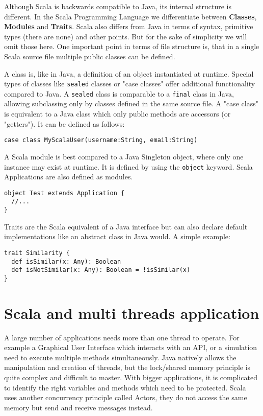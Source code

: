 \documentclass[
	a4paper,					10pt,							twoside,					openright,				notitlepage,			parskip=half,			]{scrreprt}
\begin{document}
Although Scala is backwards compatible to Java, its internal structure is different. In the Scala Programming Language 
we differentiate between \textbf{Classes}, \textbf{Modules} and \textbf{Traits}. Scala also differs from Java in terms of 
syntax, primitive types (there are none) and other points. But for the sake of simplicity we will omit those here.
One important point in terms of file structure is, that in a single Scala source file multiple public classes can be defined.

A class is, like in Java, a definition of an object instantiated at runtime. 
Special types of classes like \verb|sealed| classes or "case classes" offer 
additional functionality compared to Java. 
A \verb|sealed| class is comparable to a \verb|final| class in Java, allowing subclassing only by classes defined in the same 
source file.
A "case class" is equivalent to a Java class which only public methods are accessors (or "getters"). It can be defined as follows:

\begin{lstlisting}
case class MyScalaUser(username:String, email:String)
\end{lstlisting}

A Scala module is best compared to a Java Singleton object, where only one instance may exist at runtime. 
It is defined by using the \verb|object| keyword. Scala Applications are also defined as modules.

\begin{lstlisting}
object Test extends Application {
  //...
}
\end{lstlisting}

Traits are the Scala equivalent of a Java interface but can also declare default implementations 
like an abstract class in Java would. 
A simple example:

\begin{lstlisting}
trait Similarity {
  def isSimilar(x: Any): Boolean
  def isNotSimilar(x: Any): Boolean = !isSimilar(x)
}
\end{lstlisting}


\section{Scala and multi threads application}
\label{sec:scala_actors}
A large number of applications needs more than one thread to operate. For example a Graphical User Interface which
interacts with an \gls{API}, or a simulation need to execute multiple methods simultaneously. Java natively allows the
manipulation and creation of threads, but the lock/shared memory principle is quite complex and difficult to master.
With bigger applications, it is complicated to identify the right variables and methods which need to be protected.
Scala uses another concurrency principle called Actors, they do not access the same memory but send and receive messages instead.
\end{document}
